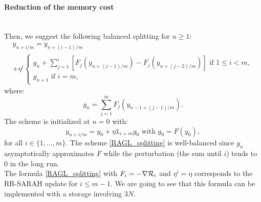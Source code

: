 \paragraph{Reduction of the memory cost}
~~\\
Then, we suggest the following balanced splitting for $n\geq 1$:
\begin{multline}
	y_{n+i/m} = y_{n+(i-1)/m} \\
	+\eta^i
	\left\{
	\begin{array}{ll}
		g_n+\displaystyle{\sum_{j=1}^i} \left[F_j\left(y_{n+(j-1)/m}\right)-F_j\left(y_{n+(j-2)/m}\right)\right] \text{ if } 1\leq i<m,\\
		g_{n+1} \text{ if } i=m,
	\end{array}
	\right.
	\label{RAGL_splitting}
\end{multline}
where:
\begin{equation*}
	g_n = \sum_{j=1}^m F_j\left(y_{n-1+(j-1)/m}\right).
\end{equation*}
The scheme is initialized at $n=0$ with:
\begin{equation*}
	y_{n+i/m} = y_0 + \eta \mathds{1}_{i=m} g_0 \text{ with } g_0 = F(y_0),
\end{equation*}
for all $i \in \{1,\dots,m\}$. 
The scheme \eqref{RAGL_splitting} is well-balanced	since $g_n$ asymptotically approximates $F$ while the perturbation (the sum until $i$) tends to 0 in the long run. \\
The formula \eqref{RAGL_splitting} with $F_i=-\nabla \mathcal{R}_i$ and $\eta^i=\eta$ corresponds to the RR-SARAH \cite{RR_SARAH} update for $i\leq m-1$. We are going to see that this formula can be implemented with a storage involving $3N$.

